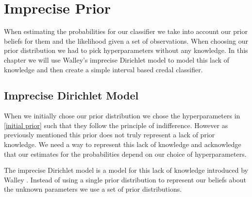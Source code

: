 \newcommand{\sn}[2]{\ensuremath{{#1}\times 10^{#2}}}

\chapter{Imprecise Prior}

When estimating the probabilities for our classifier we take into account our prior beliefs for them and the likelihood given a set of observations.
When choosing our prior distribution we had to pick hyperparameters without any knowledge.
In this chapter we will use Walley's imprecise Dirichlet model to model this lack of knowledge and then create a simple interval based credal classifier.

\section{Imprecise Dirichlet Model}

When we initially chose our prior distribution we chose the hyperparameters in \cref{initial prior} such that they follow the principle of indifference.
However as previously mentioned this prior does not truly represent a lack of prior knowledge.
We need a way to represent this lack of knowledge and acknowledge that our estimates for the probabilities depend on our choice of hyperparameters.

The imprecise Dirichlet model is a model for this lack of knowledge introduced by Walley \cite{Walley96}.
Instead of using a single prior distribution to represent our beliefs about the unknown parameters we use a set of prior distributions.

